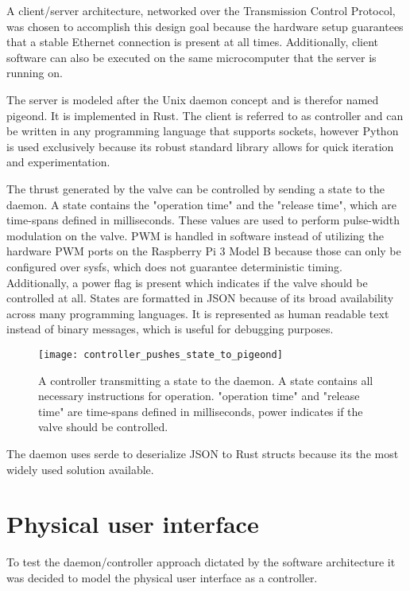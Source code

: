 A client/server architecture, networked over the Transmission Control Protocol, was chosen to accomplish this design goal because the hardware setup guarantees that a stable Ethernet connection is present at all times. Additionally, client software can also be executed on the same microcomputer that the server is running on.

The server is modeled after the Unix daemon concept and is therefor named pigeond. It is implemented in Rust. The client is referred to as controller and can be written in any programming language that supports sockets, however Python is used exclusively because its robust standard library allows for quick iteration and experimentation.

The thrust generated by the valve can be controlled by sending a state to the daemon. A state contains the "operation time" and the "release time", which are time-spans defined in milliseconds. These values are used to perform pulse-width modulation on the valve. PWM is handled in software instead of utilizing the hardware PWM ports on the Raspberry Pi 3 Model B because those can only be configured over sysfs, which does not guarantee deterministic timing. Additionally, a power flag is present which indicates if the valve should be controlled at all. States are formatted in JSON \cite{json} because of its broad availability across many programming languages. It is represented as human readable text instead of binary messages, which is useful for debugging purposes. 

\begin{figure}[h]
\centering

\texttt{[image: controller\_pushes\_state\_to\_pigeond]}

\caption{A controller transmitting a state to the daemon. A state contains all necessary instructions for operation. "operation time" and "release time" are time-spans defined in milliseconds, power indicates if the valve should be controlled.}
\end{figure}

The daemon uses serde \cite{serde} to deserialize JSON to Rust structs because its the most widely used solution available.

\section{Physical user interface}
\author{Sebastian Schaffler}

To test the daemon/controller approach dictated by the software architecture it was decided to model the physical user interface as a controller.


